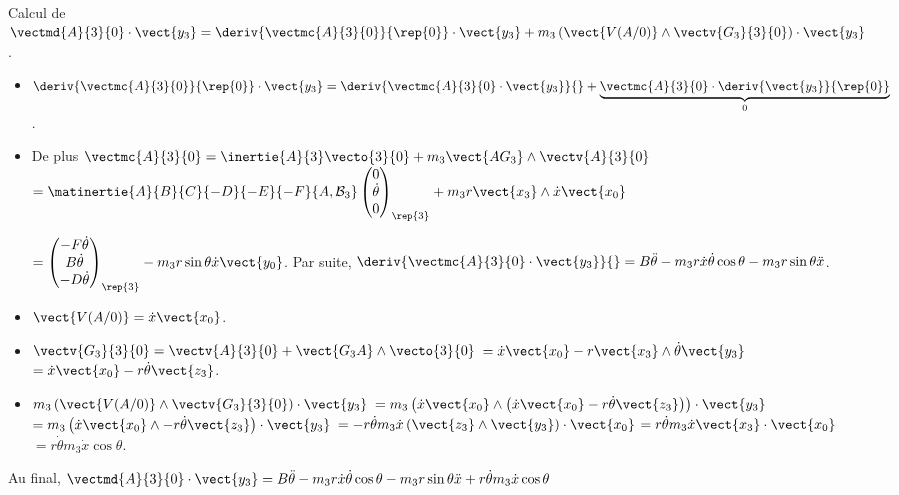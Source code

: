 \ifprof
\begin{corrige} ~\\
Calcul de $\vectmd{A}{3}{0}\cdot \vect{y_3} = \deriv{\vectmc{A}{3}{0}}{\rep{0}}\cdot \vect{y_3} + m_3 \left(\vect{V(A/0)}\wedge\vectv{G_3}{3}{0}\right)\cdot \vect{y_3}$.
\begin{itemize}

\item  $\deriv{\vectmc{A}{3}{0}}{\rep{0}}\cdot \vect{y_3} =  \deriv{\vectmc{A}{3}{0}\cdot \vect{y_3}}{}+ \underbrace{\vectmc{A}{3}{0}\cdot \deriv{\vect{y_3}}{\rep{0}}}_{0}$.  

\item De plus $\vectmc{A}{3}{0} = \inertie{A}{3} \vecto{3}{0}  + m_3 \vect{AG_3}\wedge \vectv{A}{3}{0}$ 
$= \matinertie{A}{B}{C}{-D}{-E}{-F}{A,\mathcal{B}_3} \begin{pmatrix} 0  \\ \dot{\theta} \\ 0 \end{pmatrix}_{\rep{3}}
+ m_3 r\vect{x_3}\wedge \dot{x}\vect{x_0} $ 

$ =\begin{pmatrix} -F\dot{\theta}  \\ B\dot{\theta} \\ -D\dot{\theta} \end{pmatrix}_{\rep{3}} -  m_3 r\sin\theta \dot{x}\vect{y_0} $. Par suite, $\deriv{\vectmc{A}{3}{0}\cdot \vect{y_3}}{} = B\ddot{\theta} - m_3 r\dot{x}\dot{\theta}\cos\theta - m_3 r\sin\theta \ddot{x}$.

\item  $\vect{V(A/0)}  = \dot{x}\vect{x_0}$.

\item  $\vectv{G_3}{3}{0}  = \vectv{A}{3}{0}  + \vect{G_3A} \wedge \vecto{3}{0}$  $=\dot{x}\vect{x_0} -r \vect{x_3} \wedge \dot{\theta}\vect{y_3}$ $=\dot{x}\vect{x_0} -r  \dot{\theta}\vect{z_3}$.

\item $m_3 \left(\vect{V(A/0)}\wedge\vectv{G_3}{3}{0}\right)\cdot \vect{y_3}$ 
$ = m_3 \left(\dot{x}\vect{x_0}\wedge\left( \dot{x}\vect{x_0} -r  \dot{\theta}\vect{z_3}\right)\right)\cdot \vect{y_3}$
$ = m_3 \left(\dot{x}\vect{x_0}\wedge -r  \dot{\theta}\vect{z_3} \right)\cdot \vect{y_3}$
$ =-r  \dot{\theta} m_3 \dot{x} \left(\vect{z_3}\wedge \vect{y_3} \right)\cdot \vect{x_0}$
$ =r  \dot{\theta} m_3 \dot{x} \vect{x_3} \cdot \vect{x_0}$
$ =r  \dot{\theta} m_3 \dot{x} \cos \theta $.
\end{itemize}

Au final,  $\vectmd{A}{3}{0}\cdot \vect{y_3} = B\ddot{\theta} - m_3 r\dot{x}\dot{\theta}\cos\theta - m_3 r\sin\theta \ddot{x}+r  \dot{\theta} m_3 \dot{x} \cos \theta$
\end{corrige}
\else
\fi



